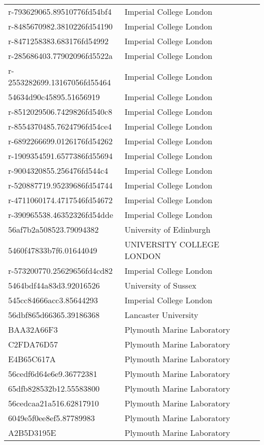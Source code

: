 \begin{tabular}{ll}
r-793629065.89510776fd54bf4 & Imperial College London \\
r-8485670982.3810226fd54190 & Imperial College London \\
r-8471258383.683176fd54992 & Imperial College London \\
r-285686403.77902096fd5522a & Imperial College London \\
r-2553282699.13167056fd55464 & Imperial College London \\
54634d90c45895.51656919 & Imperial College London \\
r-8512029506.7429826fd540c8 & Imperial College London \\
r-8554370485.7624796fd54ce4 & Imperial College London \\
r-6892266699.0126176fd54262 & Imperial College London \\
r-1909354591.6577386fd55694 & Imperial College London \\
r-9004320855.256476fd544c4 & Imperial College London \\
r-520887719.95239686fd54744 & Imperial College London \\
r-4711060174.4717546fd54672 & Imperial College London \\
r-390965538.46352326fd54dde & Imperial College London \\
56af7b2a508523.79094382 & University of Edinburgh \\
5460f47833b7f6.01644049 & UNIVERSITY COLLEGE LONDON \\
r-573200770.25629656fd4cd82 & Imperial College London \\
5464bdf44a83d3.92016526 & University of Sussex \\
545cc84666acc3.85644293 & Imperial College London \\
56dbf865d66365.39186368 & Lancaster University \\
BAA32A66F3 & Plymouth Marine Laboratory \\
C2FDA76D57 & Plymouth Marine Laboratory \\
E4B65C617A & Plymouth Marine Laboratory \\
56cedf6d64e6e9.36772381 & Plymouth Marine Laboratory \\
65dfb828532b12.55583800 & Plymouth Marine Laboratory \\
56cedcaa21a516.62817910 & Plymouth Marine Laboratory \\
6049e5f0ee8ef5.87789983 & Plymouth Marine Laboratory \\
A2B5D3195E & Plymouth Marine Laboratory \\

\end{tabular}
